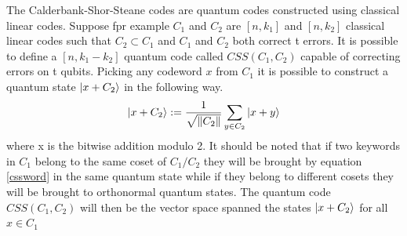 \documentclass{article}
\begin{document}
The Calderbank-Shor-Steane codes are quantum codes constructed using classical linear codes.
Suppose fpr example $C_1$ and $C_2$ are $[n,k_1]$ and $[n,k_2]$ classical linear codes such that $C_2 \subset C_1$
and $C_1$ and $C_2$ both correct t errors.
It is possible to define a $[n, k_1 - k_2]$ quantum code called $CSS(C_1, C_2)$ capable of
correcting errors on t qubits.
Picking any codeword $x$ from $C_1$ it is possible to construct a quantum state $\ket{x + C_2}$
in the following way.
\begin{equation}
	\label{cssword}
	\ket{x + C_2} := \dfrac{1}{\sqrt{\|C_2\|}} \sum_{y \in C_2}\ket{x+y}
\end{equation}
where x is the bitwise addition modulo 2.
It should be noted that if two keywords in $C_1$ belong to the same coset of $C_1/C_2$
they will be brought by equation \ref{cssword} in the same quantum
state while if they belong to different cosets they will be brought
to orthonormal quantum states.
The quantum code $CSS(C_1, C_2)$ will then be the vector space spanned the states
$\ket{x+C_2}$ for all $x \in C_1$
\end{document}
